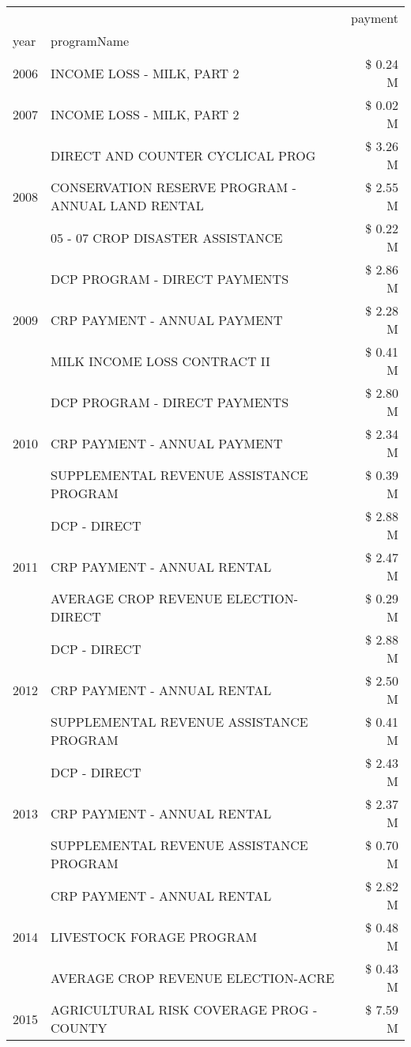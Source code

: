 \begin{tabular}{llr}
\toprule
 &  & payment \\
year & programName &  \\
\midrule
2006 & INCOME LOSS - MILK, PART 2 & \$ 0.24 M \\
\cline{1-3}
2007 & INCOME LOSS - MILK, PART 2 & \$ 0.02 M \\
\cline{1-3}
\multirow[t]{3}{*}{2008} & DIRECT AND COUNTER CYCLICAL PROG & \$ 3.26 M \\
 & CONSERVATION RESERVE PROGRAM - ANNUAL LAND RENTAL & \$ 2.55 M \\
 & 05 - 07 CROP DISASTER ASSISTANCE & \$ 0.22 M \\
\cline{1-3}
\multirow[t]{3}{*}{2009} & DCP PROGRAM - DIRECT PAYMENTS & \$ 2.86 M \\
 & CRP PAYMENT - ANNUAL PAYMENT & \$ 2.28 M \\
 & MILK INCOME LOSS CONTRACT II & \$ 0.41 M \\
\cline{1-3}
\multirow[t]{3}{*}{2010} & DCP PROGRAM - DIRECT PAYMENTS & \$ 2.80 M \\
 & CRP PAYMENT - ANNUAL PAYMENT & \$ 2.34 M \\
 & SUPPLEMENTAL REVENUE ASSISTANCE PROGRAM & \$ 0.39 M \\
\cline{1-3}
\multirow[t]{3}{*}{2011} & DCP - DIRECT & \$ 2.88 M \\
 & CRP PAYMENT - ANNUAL RENTAL & \$ 2.47 M \\
 & AVERAGE CROP REVENUE ELECTION-DIRECT & \$ 0.29 M \\
\cline{1-3}
\multirow[t]{3}{*}{2012} & DCP - DIRECT & \$ 2.88 M \\
 & CRP PAYMENT - ANNUAL RENTAL & \$ 2.50 M \\
 & SUPPLEMENTAL REVENUE ASSISTANCE PROGRAM & \$ 0.41 M \\
\cline{1-3}
\multirow[t]{3}{*}{2013} & DCP - DIRECT & \$ 2.43 M \\
 & CRP PAYMENT - ANNUAL RENTAL & \$ 2.37 M \\
 & SUPPLEMENTAL REVENUE ASSISTANCE PROGRAM & \$ 0.70 M \\
\cline{1-3}
\multirow[t]{3}{*}{2014} & CRP PAYMENT - ANNUAL RENTAL & \$ 2.82 M \\
 & LIVESTOCK FORAGE PROGRAM & \$ 0.48 M \\
 & AVERAGE CROP REVENUE ELECTION-ACRE & \$ 0.43 M \\
\cline{1-3}
\multirow[t]{3}{*}{2015} & AGRICULTURAL RISK COVERAGE PROG - COUNTY & \$ 7.59 M \\

\end{tabular}

